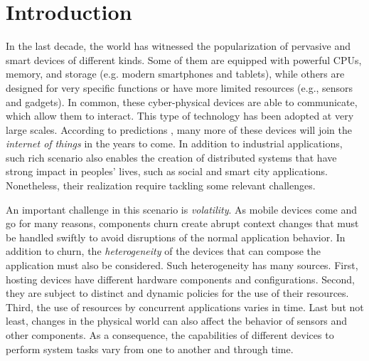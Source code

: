 \section{Introduction}
\label{sec:intro}


In the last decade, the world has witnessed the popularization of pervasive and smart devices of different kinds. Some of them are equipped with powerful CPUs, memory, and storage (e.g. modern smartphones and tablets), while others are designed for very specific functions or have more limited resources (e.g., sensors and gadgets). In common, these cyber-physical devices are able to communicate, which allow them to interact. This type of technology has been %
adopted at very large scales. According to predictions \cite{IHS:2016}, many more of these devices will join the \textit{internet of things} in the years to come. In addition to industrial applications, such rich scenario also enables the creation of distributed systems that have strong impact in peoples' lives, such as social and smart city applications. Nonetheless, their realization require tackling some relevant challenges.

An important challenge in this scenario is \textit{volatility}. As mobile devices come and go for many reasons, components churn create abrupt context changes that must be handled swiftly to avoid disruptions of the normal application behavior. 
In addition to churn, the \textit{heterogeneity} of the devices that can compose the application must also be considered. Such heterogeneity has many sources. First, hosting devices have different hardware components and configurations. Second, they are subject to distinct and dynamic policies for the use of their resources. Third, the use of resources by concurrent applications varies in time. Last but not least, changes in the physical world %
can also affect the behavior of sensors and other components. As a consequence, the capabilities of different devices to perform system tasks vary from one to another and through time.



